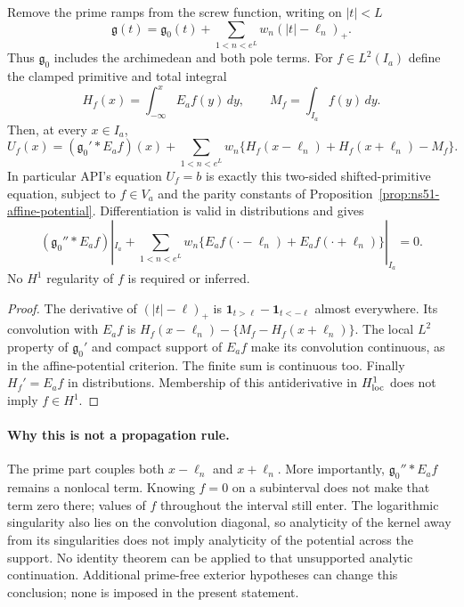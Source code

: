 \begin{proposition}
\label{prop:ns55-prime-primitives}
Remove the prime ramps from the screw function, writing on $|t|<L$
\[
 \mathfrak g(t)=\mathfrak g_0(t)+
       \sum_{1<n<e^L}w_n(|t|-\ell_n)_+.
\]
Thus $\mathfrak g_0$ includes the archimedean and both pole terms.
For $f\in L^2(I_a)$ define the clamped primitive and total integral
\[
 H_f(x)=\int_{-\infty}^x E_af(y)\,dy,
 \qquad M_f=\int_{I_a}f(y)\,dy.
\]
Then, at every $x\in I_a$,
\begin{equation}\label{eq:ns55-prime-primitive}
 U_f(x)=(\mathfrak g_0'*E_af)(x)+
 \sum_{1<n<e^L}w_n
       \{H_f(x-\ell_n)+H_f(x+\ell_n)-M_f\}.
\end{equation}
In particular API's equation $U_f=b$ is exactly this two-sided
shifted-primitive equation, subject to $f\in V_a$ and the parity constants
of Proposition~\ref{prop:ns51-affine-potential}. Differentiation is valid
in distributions and gives
\begin{equation}\label{eq:ns55-prime-differentiated}
 (\mathfrak g_0''*E_af)|_{I_a}
 +\sum_{1<n<e^L}w_n\{E_af(\cdot-\ell_n)+E_af(\cdot+\ell_n)\}|_{I_a}=0.
\end{equation}
No $H^1$ regularity of $f$ is required or inferred.
\end{proposition}
\begin{proof}
The derivative of $(|t|-\ell)_+$ is
$\mathbf1_{t>\ell}-\mathbf1_{t<-\ell}$ almost everywhere. Its
convolution with $E_af$ is
$H_f(x-\ell_n)-\{M_f-H_f(x+\ell_n)\}$.
The local $L^2$ property of $\mathfrak g_0'$ and compact support of
$E_af$ make its convolution continuous, as in the affine-potential
criterion. The finite sum is continuous too. Finally
$H_f'=E_af$ in distributions. Membership of this antiderivative in
$H^1_{\rm loc}$ does not imply $f\in H^1$.
\end{proof}

\paragraph{Why this is not a propagation rule.}
The prime part couples both $x-\ell_n$ and $x+\ell_n$.
More importantly, $\mathfrak g_0''*E_af$ remains a nonlocal term.
Knowing $f=0$ on a subinterval does not make that term zero there;
values of $f$ throughout the interval still enter. The logarithmic
singularity also lies on the convolution diagonal, so analyticity
of the kernel away from its singularities does not imply analyticity
of the potential across the support. No identity theorem can be
applied to that unsupported analytic continuation. Additional
prime-free exterior hypotheses can change this conclusion; none
is imposed in the present statement.

